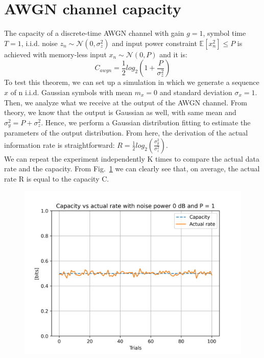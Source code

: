 \documentclass[a4paper]{article}
\begin{document}
	\section{AWGN channel capacity}
	The capacity of a discrete-time AWGN channel with gain $ g=1 $, symbol time $ T=1 $, i.i.d. noise $ z_n \sim \mathcal{N}(0,\sigma_z^2) $ and input power constraint $ \mathbb{E}[x_n^2] \le P $ is achieved with memory-less input $ x_n \sim \mathcal{N}(0,P)$ and it is:
	\begin{equation}
		C_{awgn} = \frac{1}{2} log_2 \left( 1 + \frac{P}{\sigma_z^2} \right)
	\end{equation}
	To test this theorem, we can set up a simulation in which we generate a sequence $ x $ of n i.i.d. Gaussian symbols with mean $ m_x = 0 $ and standard deviation $ \sigma_x = 1 $. Then, we analyze what we receive at the output of the AWGN channel. From theory, we know that the output is Gaussian as well, with same mean and $ \sigma_y^2 = P + \sigma_z^2 $. Hence, we perform a Gaussian distribution fitting to estimate the parameters of the output distribution. From here, the derivation of the actual information rate is straightforward: $ R = \frac{1}{2} log_2 \left( \frac{\sigma_y^2}{\sigma_z^2} \right) $.\\
	We can repeat the experiment independently K times to compare the actual data rate and the capacity.
	From Fig.~\ref{fig:awgncap} we can clearly see that, on average, the actual rate R is equal to the capacity C.
	\begin{figure}[!h]
		\centering
		\includegraphics[width=0.7\linewidth]{cap.png}
		\caption{}
		\label{fig:awgncap}
	\end{figure}
\end{document}
